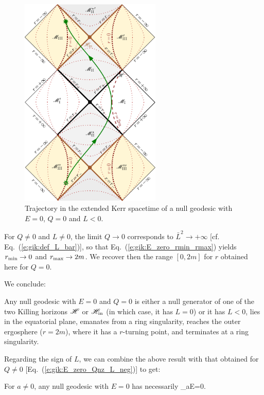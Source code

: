 \begin{figure}
\centerline{\includegraphics[width=0.6\textwidth]{gik_zero_ener_traj_q0.pdf}}
\caption[]{\label{f:gik:zero_ener_traj_q0} \footnotesize
Trajectory in the extended Kerr spacetime of a null geodesic
with $E=0$, $Q=0$ and $L<0$.
}
\end{figure}


\begin{remark}
For $Q\neq 0$ and $L\neq 0$, the limit $Q\to 0$ corresponds to
$\bar{L}^2 \to +\infty$ [cf. Eq.~(\ref{e:gik:def_L_bar})], so that
Eq.~(\ref{e:gik:E_zero_rmin_rmax}) yields
$r_{\rm min}\to 0$ and $r_{\rm max}\to 2m$.
We recover then the range $[0, 2m]$ for $r$ obtained here for $Q=0$.
\end{remark}


We conclude:
\begin{prop}[null geodesic with $E=0$ and $Q=0$]
Any null geodesic with $E=0$ and $Q=0$
is either a null generator of one of the two Killing horizons
$\mathscr{H}$ or $\mathscr{H}_{\rm in}$ (in which case, it has $L=0$) or it has
$L < 0$, lies in the equatorial plane,
emanates from a ring singularity, reaches the outer ergosphere ($r=2m$),
where it has a $r$-turning point, and terminates at a ring singularity.
\end{prop}

Regarding the sign of $L$, we can combine the above result with that
obtained for $Q\neq 0$ [Eq.~(\ref{e:gik:E_zero_Qnz_L_neg})] to get:
\begin{prop}
For $a\neq 0$, any null geodesic with $E=0$ has necessarily
\be
    _{{a\atop E=0}}.
\ee
\end{prop}

